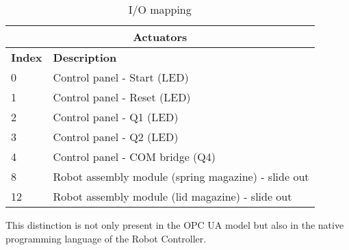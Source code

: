 \documentclass{article}
\begin{document}
\begin{table}
	\setlength\extrarowheight{4pt}
	\small
	\begin{tabularx}{\textwidth}{|p{1cm}|X|}
		\hline
		\multicolumn{2}{|c|}{\bf \color{black} \large Actuators}\\
		\hline\hline
		\bf Index & \bf Description\\
		\hline\hline
		0 & Control panel - Start (LED)\\
		\hline
		1 & Control panel - Reset (LED)\\
		\hline
		2 & Control panel - Q1 (LED)\\
		\hline
		3 & Control panel - Q2 (LED)\\
		\hline
		4 & Control panel - COM bridge (Q4)\\
		\hline
		8 & Robot assembly module (spring magazine) - slide out\\
		\hline
		12 & Robot assembly module (lid magazine) - slide out\\
		\hline
	\end{tabularx}
	\caption{I/O mapping}
	\label{tab:io}
\end{table}
This distinction is not only present in the OPC UA model but also in the native programming language of the Robot Controller.
\end{document}
